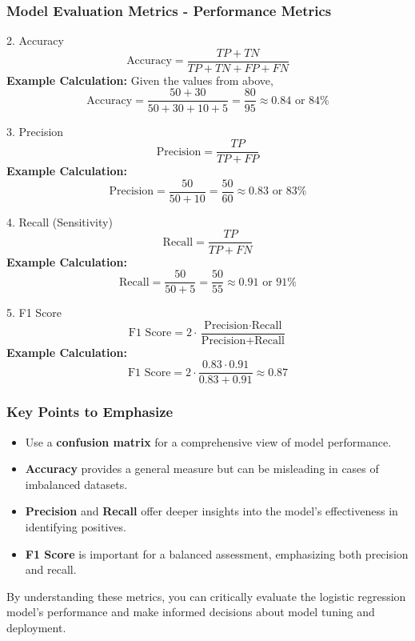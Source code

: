 \documentclass[aspectratio=169]{beamer}
\begin{document}
\begin{frame}[fragile]
    \frametitle{Model Evaluation Metrics - Performance Metrics}
    \begin{block}{2. Accuracy}
        \[
        \text{Accuracy} = \frac{TP + TN}{TP + TN + FP + FN}
        \]
        \textbf{Example Calculation:} Given the values from above,
        \[
        \text{Accuracy} = \frac{50 + 30}{50 + 30 + 10 + 5} = \frac{80}{95} \approx 0.84 \text{ or } 84\%
        \]
    \end{block}
    
    \begin{block}{3. Precision}
        \[
        \text{Precision} = \frac{TP}{TP + FP}
        \]
        \textbf{Example Calculation:}
        \[
        \text{Precision} = \frac{50}{50 + 10} = \frac{50}{60} \approx 0.83 \text{ or } 83\%
        \]
    \end{block}
    
    \begin{block}{4. Recall (Sensitivity)}
        \[
        \text{Recall} = \frac{TP}{TP + FN}
        \]
        \textbf{Example Calculation:}
        \[
        \text{Recall} = \frac{50}{50 + 5} = \frac{50}{55} \approx 0.91 \text{ or } 91\%
        \]
    \end{block}
    
    \begin{block}{5. F1 Score}
        \[
        \text{F1 Score} = 2 \cdot \frac{\text{Precision} \cdot \text{Recall}}{\text{Precision} + \text{Recall}}
        \]
        \textbf{Example Calculation:}
        \[
        \text{F1 Score} = 2 \cdot \frac{0.83 \cdot 0.91}{0.83 + 0.91} \approx 0.87
        \]
    \end{block}
\end{frame}

\begin{frame}[fragile]
    \frametitle{Key Points to Emphasize}
    \begin{itemize}
        \item Use a \textbf{confusion matrix} for a comprehensive view of model performance.
        \item \textbf{Accuracy} provides a general measure but can be misleading in cases of imbalanced datasets.
        \item \textbf{Precision} and \textbf{Recall} offer deeper insights into the model's effectiveness in identifying positives.
        \item \textbf{F1 Score} is important for a balanced assessment, emphasizing both precision and recall.
    \end{itemize}
    
    By understanding these metrics, you can critically evaluate the logistic regression model’s performance and make informed decisions about model tuning and deployment.
\end{frame}
\end{document}
